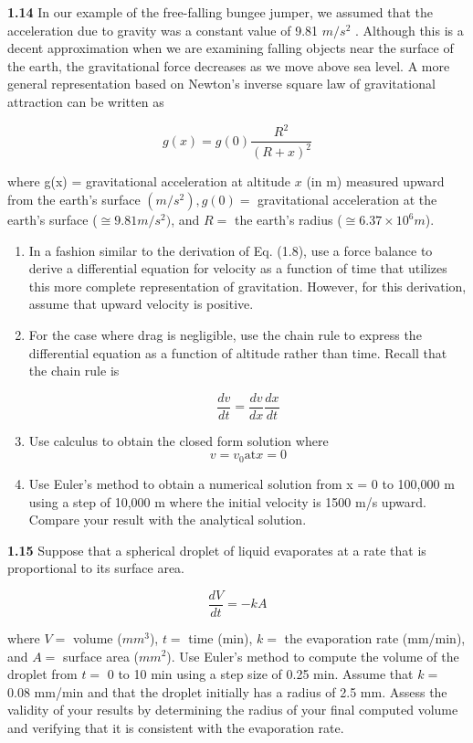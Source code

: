 \documentclass[../main.tex]{subfiles}
\begin{document}
\begin{multicols}{2}
\textbf{1.14} In our example of the free-falling bungee jumper, we
assumed that the acceleration due to gravity was a constant
value of 9.81 $m/s^2$
. Although this is a decent approximation
when we are examining falling objects near the surface of
the earth, the gravitational force decreases as we move
above sea level. A more general representation based on
Newton's inverse square law of gravitational attraction can
be written as

$$ g(x)= g(0)\dfrac{R^2}{(R+x)^2}$$

where g(x) = gravitational acceleration at altitude $x$ (in m)
measured upward from the earth's surface $(m/s^2), g(0) =$
gravitational acceleration at the earth's surface ($\cong  9.81 m/s^2)$,
and $R =$ the earth's radius ($\cong  6.37 × 10^6 m$). 
\begin{enumerate}[label=(\alph*)]
	\item  In a fashion similar to the derivation of Eq. (1.8), use a
	force balance to derive a differential equation for velocity as a function of time that utilizes this more complete
	representation of gravitation. However, for this derivation, assume that upward velocity is positive. 

	\item For the case where drag is negligible, use the chain rule
	to express the differential equation as a function of altitude rather than time. Recall that the chain rule is

	$$\dfrac{dv}{dt} = \dfrac{dv}{dx}\dfrac{dx}{dt} $$

	\item Use calculus to obtain the closed form solution where
	$$ v=v_0 \text{at} x=0 $$
	\item Use Euler's method to obtain a numerical solution from
	x = 0 to 100,000 m using a step of 10,000 m where the
	initial velocity is 1500 m/s upward. Compare your result
	with the analytical solution.


\end{enumerate}

\textbf{1.15} Suppose that a spherical droplet of liquid evaporates at
a rate that is proportional to its surface area.


$$ \dfrac{dV}{dt} = -kA$$

where $V =$ volume ($mm^3$), $t =$ time (min), $k =$ the evaporation rate (mm/min), and $A =$ surface area ($mm^2$). Use
Euler's method to compute the volume of the droplet from
$t =$ 0 to 10 min using a step size of 0.25 min. Assume that
$k =$ 0.08 mm/min and that the droplet initially has a radius of
2.5 mm. Assess the validity of your results by determining
the radius of your final computed volume and verifying that
it is consistent with the evaporation rate. 


\end{multicols}
\end{document}
